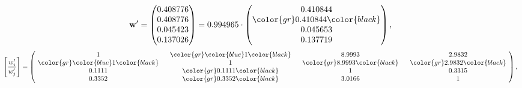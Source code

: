 \begin{example}
\begin{equation*}
\mathbf{w}^{\prime} =
\begin{pmatrix}
0.408776\\
0.408776\\
0.045423\\
0.137026
\end{pmatrix} =
0.994965\cdot
\begin{pmatrix}
0.410844\\
\color{gr} 0.410844\color{black} \\
0.045653\\
0.137719
\end{pmatrix},
\end{equation*}
\begin{equation*}
\left[ \frac{{w}^{\prime}_i}{{w}^{\prime}_j} \right] =
\begin{pmatrix}
$\,\,$ 1 $\,\,$ & $\,\,$\color{gr} \color{blue} 1\color{black} $\,\,$ & $\,\,$8.9993$\,\,$ & $\,\,$2.9832$\,\,$ \\
$\,\,$\color{gr} \color{blue} 1\color{black} $\,\,$ & $\,\,$ 1 $\,\,$ & $\,\,$\color{gr} 8.9993\color{black} $\,\,$ & $\,\,$\color{gr} 2.9832\color{black}   $\,\,$ \\
$\,\,$0.1111$\,\,$ & $\,\,$\color{gr} 0.1111\color{black} $\,\,$ & $\,\,$ 1 $\,\,$ & $\,\,$0.3315 $\,\,$ \\
$\,\,$0.3352$\,\,$ & $\,\,$\color{gr} 0.3352\color{black} $\,\,$ & $\,\,$3.0166$\,\,$ & $\,\,$ 1  $\,\,$ \\
\end{pmatrix},
\end{equation*}
\end{example}
\newpage
